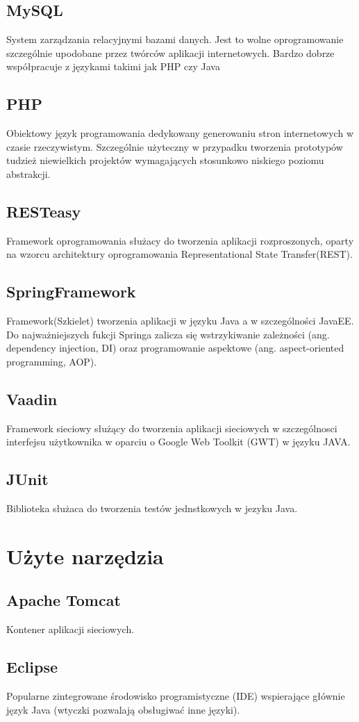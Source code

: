 \documentclass[11pt,a4paper,polish,thesis]{dcsbook}
\begin{document}
\subsection{MySQL}
System zarządzania relacyjnymi bazami danych. Jest to wolne oprogramowanie szczególnie upodobane przez twórców aplikacji internetowych. Bardzo dobrze współpracuje z językami takimi jak PHP czy Java
\subsection{PHP}
Obiektowy język programowania dedykowany generowaniu stron internetowych w czasie rzeczywistym. Szczególnie użyteczny w przypadku tworzenia prototypów tudzież niewielkich projektów wymagających stosunkowo niskiego poziomu abstrakcji.
\subsection{RESTeasy}
Framework oprogramowania służacy do tworzenia aplikacji rozproszonych, oparty na wzorcu architektury oprogramowania Representational State Transfer(REST).
\subsection{SpringFramework}
Framework(Szkielet) tworzenia aplikacji w języku Java a w szczególności JavaEE. Do najważniejszych fukcji Springa zalicza się wstrzykiwanie zależności (ang. dependency injection, DI) oraz programowanie aspektowe (ang. aspect-oriented programming, AOP).  
\subsection{Vaadin}
Framework sieciowy służący do tworzenia aplikacji sieciowych w szczególnosci interfejsu użytkownika w oparciu o Google Web Toolkit (GWT) w języku JAVA.
\subsection{JUnit}
Biblioteka służaca do tworzenia testów jednstkowych w jezyku Java.

\section{Użyte narzędzia}
\subsection{Apache Tomcat}
Kontener aplikacji sieciowych.
\subsection{Eclipse}
Popularne zintegrowane środowisko programistyczne (IDE) wspierające głównie język Java (wtyczki pozwalają obsługiwać inne języki). 
\end{document}
